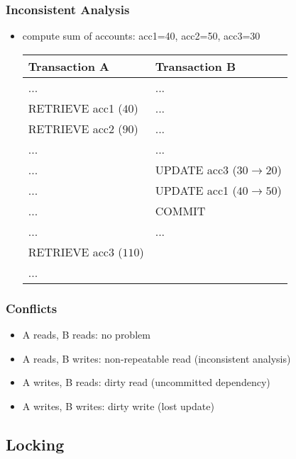 \documentclass[dvipsnames]{beamer}
\theoremstyle{plain}
\begin{document}
\begin{frame}[fragile]
  \frametitle{Inconsistent Analysis}

  \begin{itemize}
    \item compute sum of accounts: acc1=40, acc2=50, acc3=30
    \smallskip
    \begin{table}
      \begin{tabular}{ll}
Transaction A         & Transaction B                    \\\hline
...                   & ...                              \\\pause
RETRIEVE acc1 ($40$)  & ...                              \\\pause
RETRIEVE acc2 ($90$)  & ...                              \\\pause
...                   & ...                              \\
...                   & UPDATE acc3 ($30 \rightarrow 20$)\\
...                   & UPDATE acc1 ($40 \rightarrow 50$)\\
...                   & COMMIT                           \\\pause
...                   & ...                              \\
RETRIEVE acc3 ($110$) &                                  \\
...                   &
      \end{tabular}
    \end{table}
  \end{itemize}
\end{frame}

\begin{frame}
  \frametitle{Conflicts}

  \begin{itemize}
    \item A reads, B reads: no problem
    \item A reads, B writes: non-repeatable read (inconsistent analysis)
    \item A writes, B reads: dirty read (uncommitted dependency)
    \item A writes, B writes: dirty write (lost update)
  \end{itemize}
\end{frame}

\subsection{Locking}
\end{document}
